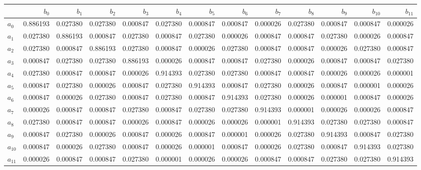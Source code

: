 \begin{tabular}{lrrrrrrrrrrrr}
\toprule
 & $b_{0}$ & $b_{1}$ & $b_{2}$ & $b_{3}$ & $b_{4}$ & $b_{5}$ & $b_{6}$ & $b_{7}$ & $b_{8}$ & $b_{9}$ & $b_{10}$ & $b_{11}$ \\
\midrule
$a_{0}$ & 0.886193 & 0.027380 & 0.027380 & 0.000847 & 0.027380 & 0.000847 & 0.000847 & 0.000026 & 0.027380 & 0.000847 & 0.000847 & 0.000026 \\
$a_{1}$ & 0.027380 & 0.886193 & 0.000847 & 0.027380 & 0.000847 & 0.027380 & 0.000026 & 0.000847 & 0.000847 & 0.027380 & 0.000026 & 0.000847 \\
$a_{2}$ & 0.027380 & 0.000847 & 0.886193 & 0.027380 & 0.000847 & 0.000026 & 0.027380 & 0.000847 & 0.000847 & 0.000026 & 0.027380 & 0.000847 \\
$a_{3}$ & 0.000847 & 0.027380 & 0.027380 & 0.886193 & 0.000026 & 0.000847 & 0.000847 & 0.027380 & 0.000026 & 0.000847 & 0.000847 & 0.027380 \\
$a_{4}$ & 0.027380 & 0.000847 & 0.000847 & 0.000026 & 0.914393 & 0.027380 & 0.027380 & 0.000847 & 0.000847 & 0.000026 & 0.000026 & 0.000001 \\
$a_{5}$ & 0.000847 & 0.027380 & 0.000026 & 0.000847 & 0.027380 & 0.914393 & 0.000847 & 0.027380 & 0.000026 & 0.000847 & 0.000001 & 0.000026 \\
$a_{6}$ & 0.000847 & 0.000026 & 0.027380 & 0.000847 & 0.027380 & 0.000847 & 0.914393 & 0.027380 & 0.000026 & 0.000001 & 0.000847 & 0.000026 \\
$a_{7}$ & 0.000026 & 0.000847 & 0.000847 & 0.027380 & 0.000847 & 0.027380 & 0.027380 & 0.914393 & 0.000001 & 0.000026 & 0.000026 & 0.000847 \\
$a_{8}$ & 0.027380 & 0.000847 & 0.000847 & 0.000026 & 0.000847 & 0.000026 & 0.000026 & 0.000001 & 0.914393 & 0.027380 & 0.027380 & 0.000847 \\
$a_{9}$ & 0.000847 & 0.027380 & 0.000026 & 0.000847 & 0.000026 & 0.000847 & 0.000001 & 0.000026 & 0.027380 & 0.914393 & 0.000847 & 0.027380 \\
$a_{10}$ & 0.000847 & 0.000026 & 0.027380 & 0.000847 & 0.000026 & 0.000001 & 0.000847 & 0.000026 & 0.027380 & 0.000847 & 0.914393 & 0.027380 \\
$a_{11}$ & 0.000026 & 0.000847 & 0.000847 & 0.027380 & 0.000001 & 0.000026 & 0.000026 & 0.000847 & 0.000847 & 0.027380 & 0.027380 & 0.914393 \\
\bottomrule
\end{tabular}
